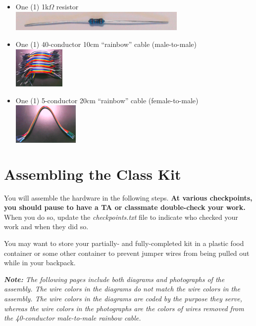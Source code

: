 \begin{itemize}
    \item One (1) 1k$\Omega$ resistor \\
        \includegraphics[height=1cm]{resistor}
    \item One (1) 40-conductor 10cm ``rainbow'' cable (male-to-male) \\
        \includegraphics[height=2cm]{mm-cable}
    \item One (1) 5-conductor 20cm ``rainbow'' cable (female-to-male) \\
        \includegraphics[height=2cm]{fm-cable}
\end{itemize}

\vspace{0.5cm}

\section*{Assembling the Class Kit}

You will assemble the hardware in the following steps. \textbf{At various
checkpoints, you should pause to have a TA or classmate double-check your
work.} When you do so, update the \textit{checkpoints.txt} file to indicate who
checked your work and when they did so.

You may want to store your partially- and fully-completed kit in a plastic food
container or some other container to prevent jumper wires from being pulled out
while in your backpack.

\textit{\textbf{Note:} The following pages include both diagrams and
photographs of the assembly. The wire colors in the diagrams do not match the
wire colors in the assembly. The wire colors in the diagrams are coded by the
purpose they serve, whereas the wire colors in the photographs are the colors
of wires removed from the 40-conductor male-to-male rainbow cable.}

